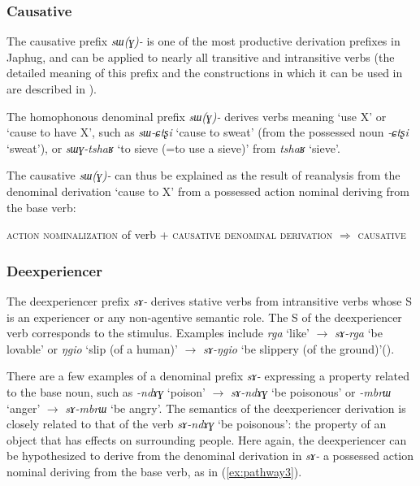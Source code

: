 \documentclass[oneside,a4paper,11pt]{article}
\newcommand{\ipa}[1]{\mbox{\phon\textit{#1}}} %
\begin{document}
\subsubsection{Causative}  \label{sec:causative}
The causative prefix \ipa{sɯ(ɣ)-} is one of the most productive derivation prefixes in Japhug, and can be applied to nearly all transitive and intransitive verbs (the detailed meaning of this prefix and the constructions in which it can be used in are described in \citealt{jacques15causative}). 

 The homophonous denominal prefix \ipa{sɯ(ɣ)-} derives verbs meaning `use X' or `cause to have X', such as \ipa{sɯ-ɕtʂi} `cause to sweat' (from the possessed noun \ipa{-ɕtʂi} `sweat'), or \ipa{sɯɣ-tshaʁ} `to sieve (=to use a sieve)' from \ipa{tshaʁ} `sieve'. 

The causative \ipa{sɯ(ɣ)-} can thus be explained as the result of reanalysis from the denominal derivation `cause to X' from a possessed action nominal deriving from the base verb:

\begin{exe}
\ex \label{ex:pathway2}
\glt \textsc{action nominalization} of verb + \textsc{causative denominal derivation} $\Rightarrow$ \textsc{causative}
\end{exe} 

 


\subsubsection{Deexperiencer} \label{sec:deexp}
 
 The deexperiencer prefix \ipa{sɤ-} derives stative verbs from intransitive verbs whose S is an experiencer or any non-agentive semantic role. The S of the deexperiencer verb corresponds to the stimulus. Examples include \ipa{rga} `like' $\rightarrow$ \ipa{sɤ-rga} `be lovable' or \ipa{ŋgio} `slip (of a human)' $\rightarrow$ \ipa{sɤ-ŋgio} `be slippery (of the ground)'(\citealt{jacques12demotion}).

There are a few examples of a denominal prefix \ipa{sɤ-} expressing a property related to the base noun, such as \ipa{-ndɤɣ} `poison' $\rightarrow$ \ipa{sɤ-ndɤɣ} `be poisonous' or \ipa{-mbrɯ} `anger'  $\rightarrow$ \ipa{sɤ-mbrɯ} `be angry'. The semantics of the deexperiencer derivation is closely related to that of the verb  \ipa{sɤ-ndɤɣ} `be poisonous': the property of an object that has effects on surrounding people. Here again, the deexperiencer can be hypothesized to derive from the denominal derivation in \ipa{sɤ-} a possessed action nominal deriving from the base verb, as in (\ref{ex:pathway3}).
\end{document}

